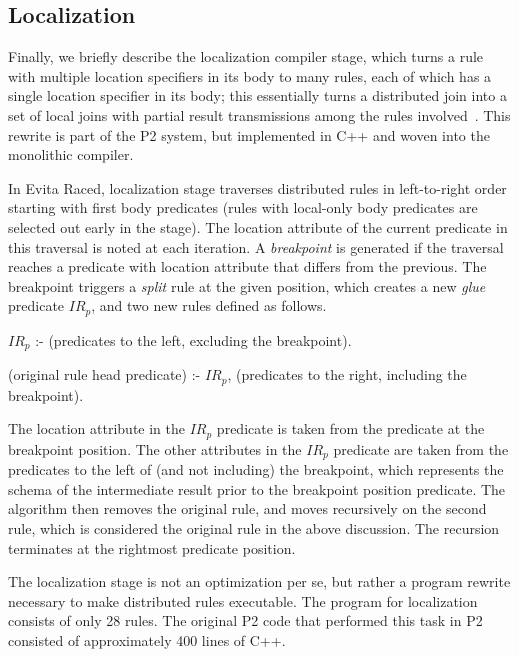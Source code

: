 \subsection{Localization}
\label{ch:evita:sec:localization}

Finally, we briefly describe the localization compiler stage, which turns
a rule with  multiple
location specifiers in its body to many rules, each of which has a
single location specifier in its body; this essentially turns a
distributed join into a set of local joins with partial result
transmissions among the rules involved~\cite{loo-sigmod06}. This rewrite
is part of the P2
system, but implemented in C++ and woven into the monolithic compiler.

In Evita Raced, localization stage traverses distributed rules in
left-to-right order starting with first body predicates (rules with
local-only body predicates are selected out early in the stage). 
The location attribute of the current predicate in this traversal is noted at each iteration.
A {\em breakpoint} is generated if the traversal reaches a predicate with location attribute 
that differs from the previous. The breakpoint triggers a {\em split} rule at the given 
position, which creates a new {\em glue} predicate $IR_p$, and two new rules defined as follows.
\begin{CompactEnumerate}
\item $IR_p$ :- (predicates to the left, excluding the breakpoint).
\item (original rule head predicate) :- $IR_p$, (predicates to the right, including the breakpoint). 
\end{CompactEnumerate}
The location attribute in the $IR_p$ predicate is taken from the predicate at the breakpoint position.
The other attributes in the $IR_p$ predicate are taken from the predicates to the left of (and not 
including) the breakpoint, which represents the schema of the intermediate result prior to the
breakpoint position predicate. The algorithm then removes the original rule, and moves recursively on
the second rule, which is considered the original rule in the above discussion. 
The recursion terminates at the rightmost predicate position. 

The localization stage is not an optimization per se, but rather a  program rewrite necessary to make distributed rules executable. 
The \OVERLOG program for localization consists of only 28 rules. The original P2
code that performed this task in P2 consisted of approximately 400 lines of
C++.  


